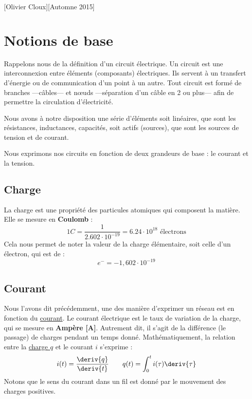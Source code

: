 \documentclass[12pt,a4paper]{article}
\begin{document}
[Olivier Cloux][Automne 2015]
\begin{multicols}{2}
	\tableofcontents
\end{multicols}

\section{Notions de base}
\label{section: notion de base}
Rappelons nous de la définition d'un circuit électrique. Un circuit est une interconnexion entre éléments (composants) électriques. Ils servent à un transfert d'énergie ou de communication d'un point à un autre. Tout circuit est formé de branches ---câbles--- et n\oe uds ---séparation d'un câble en 2 ou plus--- afin de permettre la circulation d'électricité. 

Nous avons à notre disposition une série d'éléments soit linéaires, que sont les résistances, inductances, capacités, soit actifs (sources), que sont les sources de tension et de courant.

Nous exprimons nos circuits en fonction de deux grandeurs de base : le courant et la tension.

\subsection{Charge}
\label{subsection: base charge}
La charge est une propriété des particules atomiques qui composent la matière. Elle se mesure en \textbf{Coulomb} :
\begin{equation}
	1C = \frac{1}{2.602\cdot10^{-19}} = 6.24\cdot 10^{18} \text{ électrons}
	\label{equ: definition charge}
\end{equation}
Cela nous permet de noter la valeur de la charge élémentaire, soit celle d'un électron, qui est de :
\[e^{-} = -1,602 \cdot 10^{-19}\]

\subsection{Courant}
\label{subsection: base courant}
Nous l'avons dit précédemment, une des manière d'exprimer un réseau est en fonction du \uline{courant}. Le courant électrique est le taux de variation de la charge, qui se mesure en \textbf{Ampère [A]}. Autrement dit, il s'agit de la différence (le passage) de charges pendant un temps donné. Mathématiquement, la relation entre la \uline{charge $q$} et le courant $i$ s'exprime :
\begin{equation}
	i(t) = \frac{\deriv{q}}{\deriv{t}} \qquad q(t) = \int_0^t i(\tau) \deriv{\tau}
	\label{equ: relation charge courant}
\end{equation}
Notons que le sens du courant dans un fil est donné par le mouvement des charges positives. 
\end{document}
